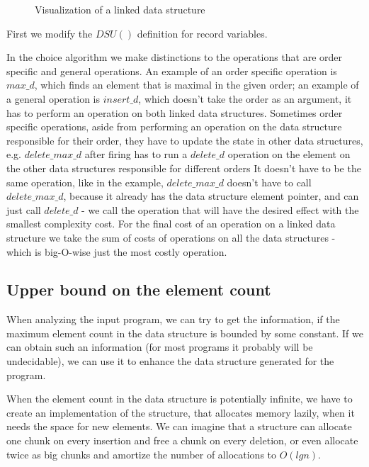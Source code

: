 \documentclass[a4paper,11pt]{article}
\begin{document}
            \begin{figure}[h!]
				\caption{Visualization of a linked data structure}

				\label{fig:linked-data-structures}
			\end{figure}

            First we modify the $DSU()$ definition for record variables.

            In the choice algorithm we make distinctions to the operations that are order specific and general
            operations. An example of an order specific operation is $max\_d$, which finds an element that is maximal in
            the given order; an example of a general operation is $insert\_d$, which doesn't take the order as an
            argument, it has to perform an operation on both linked data structures. Sometimes order specific
            operations, aside from performing an operation on the data structure responsible for their order, they have
            to update the state in other data structures, e.g. $delete\_max\_d$ after firing has to run a $delete\_d$
            operation on the element on the other data structures responsible for different orders It doesn't have to
            be the same operation, like in the example, $delete\_max\_d$ doesn't have to call $delete\_max\_d$, because
            it already has the data structure element pointer, and can just call $delete\_d$ - we call the operation
            that will have the desired effect with the smallest complexity cost. For the final cost of an operation on a
            linked data structure we take the sum of costs of operations on all the data structures - which is
            big-O-wise just the most costly operation.

	\subsection{Upper bound on the element count}

		When analyzing the input program, we can try to get the information, if the maximum element count in the
		data structure is bounded by some constant. If we can obtain such an information (for most programs it
		probably will be undecidable), we can use it to enhance the data structure generated for the program.

		When the element count in the data structure is potentially infinite, we have to create an
		implementation of the structure, that allocates memory lazily, when it needs the space for new elements.
		We can imagine that a structure can allocate one chunk on every insertion and free a chunk on every
		deletion, or even allocate twice as big chunks and amortize the number of allocations to $O(lg n)$.
\end{document}
